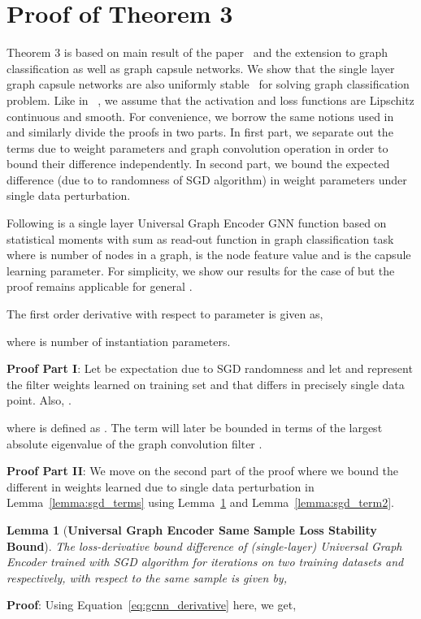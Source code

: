 \documentclass{article}
\newtheorem{lemma}{Lemma}
\begin{document}
\section{Proof of Theorem 3}

Theorem 3 is based on main result of the paper~\cite{verma2019stability} and the extension to graph classification as well as graph capsule networks. We  show that the single layer graph capsule networks are also uniformly stable~\cite{bousquet2002stability} for solving  graph  classification problem. Like in ~\cite{verma2019stability}, we assume that the activation and loss functions are Lipschitz continuous and smooth. For convenience, we borrow the same notions used in~\cite{verma2019stability}   and  similarly divide the proofs in two parts. In first part, we separate out the  terms due to  weight parameters and graph convolution operation in order to bound their difference   independently. In second part, we bound the expected difference (due to   to randomness of SGD algorithm) in weight parameters  under single data perturbation. 

Following is a single layer Universal Graph Encoder  GNN function    based on statistical moments with sum as read-out function in graph classification task where  is number of nodes in a graph,  is the  node feature value and  is the capsule learning parameter. For simplicity, we show our results for the case of   but the proof remains applicable for general  .

The first order derivative with respect to parameter is given as,


where  is number of instantiation parameters.



\noindent \textbf{Proof Part I}:   Let  be expectation due to SGD randomness and let  and   represent the     filter weights learned on training set  and  that differs in precisely single data point. Also,   . 




where  
 is defined as .
The term  will later be bounded in terms of the largest absolute eigenvalue of the graph convolution filter .  

\noindent \textbf{Proof Part II}:   We move on the second part of the proof where we bound the different in weights learned due to single data perturbation in Lemma~\ref{lemma:sgd_terms} using Lemma~\ref{lemma:sgd_term1} and Lemma~\ref{lemma:sgd_term2}. 


\begin{lemma}[\textbf{Universal Graph Encoder    Same Sample Loss Stability Bound}]\label{lemma:sgd_term1}  \textit{The   loss-derivative bound difference   of (single-layer) Universal Graph Encoder    trained with SGD algorithm for  iterations on two training datasets  and  respectively, with respect to the same sample     is given by,}
	
\end{lemma}
\noindent \textbf{Proof}:  Using Equation~\ref{eq:gcnn_derivative} here, we get,	
\end{document}
